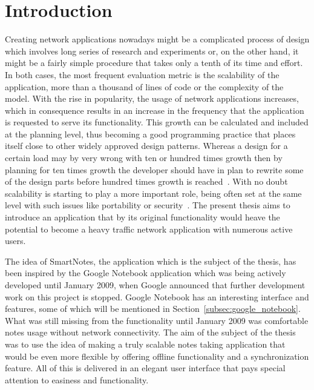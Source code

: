 \chapter{Introduction}\label{sec:Introduction}
Creating network applications nowadays might be a complicated process of design which involves long series of research and experiments or, on the other hand, it might be a fairly simple procedure that takes only a tenth of its time and effort. In both cases, the most frequent evaluation metric is the scalability of the application, more than a thousand of lines of code or the complexity of the model. With the rise in popularity, the usage of network applications increases, which in consequence results in an increase in the frequency that the application is requested to serve its functionality. This growth can be calculated and included at the planning level, thus becoming a good programming practice that places itself close to other widely approved design patterns. Whereas a design for a certain load may by very wrong with ten or hundred times growth then by planning for ten times growth the developer should have in plan to rewrite some of the design parts before hundred times growth is reached~\cite{google_wsdm}. With no doubt scalability is starting to play a more important role, being often set at the same level with such issues like portability or security~\cite{scalable_delft}. The present thesis aims to introduce an application that by its original functionality would heave the potential to become a heavy traffic network application with numerous active users. 

The idea of SmartNotes, the application which is the subject of the thesis, has been inspired by the Google Notebook application which was being actively developed until January 2009, when Google announced that further development work on this project is stopped. Google Notebook has an interesting interface and features, some of which will be mentioned in Section~\ref{subsec:google_notebook}. What was still missing from the functionality until January 2009 was comfortable notes usage without network connectivity. The aim of the subject of the thesis was to use the idea of making a truly scalable notes taking application that would be even more flexible by offering offline functionality and a synchronization feature. All of this is delivered in an elegant user interface that pays special attention to easiness and functionality.

